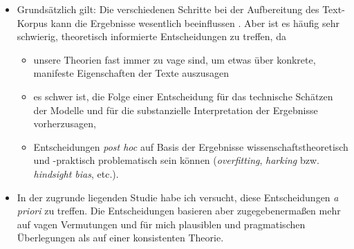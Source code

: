 \documentclass[
]{book}
\providecommand{\tightlist}{%
  \setlength{\itemsep}{0pt}\setlength{\parskip}{0pt}}
\begin{document}
\begin{itemize}
\tightlist
\item
  Grundsätzlich gilt: Die verschiedenen Schritte bei der Aufbereitung des Text-Korpus kann die Ergebnisse wesentlich beeinflussen \citep{dennyTextPreprocessingUnsupervised2018, maierApplyingLDATopic2018}. Aber ist es häufig sehr schwierig, theoretisch informierte Entscheidungen zu treffen, da

  \begin{itemize}
  \tightlist
  \item
    unsere Theorien fast immer zu vage sind, um etwas über konkrete, manifeste Eigenschaften der Texte auszusagen
  \item
    es schwer ist, die Folge einer Entscheidung für das technische Schätzen der Modelle und für die substanzielle Interpretation der Ergebnisse vorherzusagen,
  \item
    Entscheidungen \emph{post hoc} auf Basis der Ergebnisse wissenschaftstheoretisch und -praktisch problematisch sein können (\emph{overfitting}, \emph{harking} bzw. \emph{hindsight bias}, etc.).
  \end{itemize}
\item
  In der zugrunde liegenden Studie habe ich versucht, diese Entscheidungen \emph{a priori} zu treffen. Die Entscheidungen basieren aber zugegebenermaßen mehr auf vagen Vermutungen und für mich plausiblen und pragmatischen Überlegungen als auf einer konsistenten Theorie.


\end{itemize}
\end{document}
